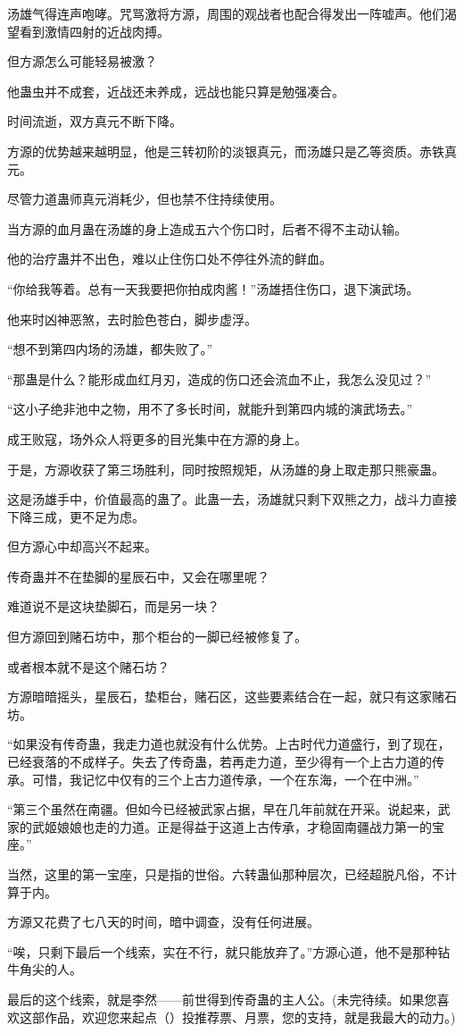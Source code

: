 \begin{this_body}
汤雄气得连声咆哮。咒骂激将方源，周围的观战者也配合得发出一阵嘘声。他们渴望看到激情四射的近战肉搏。

但方源怎么可能轻易被激？

他蛊虫并不成套，近战还未养成，远战也能只算是勉强凑合。

时间流逝，双方真元不断下降。

方源的优势越来越明显，他是三转初阶的淡银真元，而汤雄只是乙等资质。赤铁真元。

尽管力道蛊师真元消耗少，但也禁不住持续使用。

当方源的血月蛊在汤雄的身上造成五六个伤口时，后者不得不主动认输。

他的治疗蛊并不出色，难以止住伤口处不停往外流的鲜血。

“你给我等着。总有一天我要把你拍成肉酱！”汤雄捂住伤口，退下演武场。

他来时凶神恶煞，去时脸色苍白，脚步虚浮。

“想不到第四内场的汤雄，都失败了。”

“那蛊是什么？能形成血红月刃，造成的伤口还会流血不止，我怎么没见过？”

“这小子绝非池中之物，用不了多长时间，就能升到第四内城的演武场去。”

成王败寇，场外众人将更多的目光集中在方源的身上。

于是，方源收获了第三场胜利，同时按照规矩，从汤雄的身上取走那只熊豪蛊。

这是汤雄手中，价值最高的蛊了。此蛊一去，汤雄就只剩下双熊之力，战斗力直接下降三成，更不足为虑。

但方源心中却高兴不起来。

传奇蛊并不在垫脚的星辰石中，又会在哪里呢？

难道说不是这块垫脚石，而是另一块？

但方源回到赌石坊中，那个柜台的一脚已经被修复了。

或者根本就不是这个赌石坊？

方源暗暗摇头，星辰石，垫柜台，赌石区，这些要素结合在一起，就只有这家赌石坊。

“如果没有传奇蛊，我走力道也就没有什么优势。上古时代力道盛行，到了现在，已经衰落的不成样子。失去了传奇蛊，若再走力道，至少得有一个上古力道的传承。可惜，我记忆中仅有的三个上古力道传承，一个在东海，一个在中洲。”

“第三个虽然在南疆。但如今已经被武家占据，早在几年前就在开采。说起来，武家的武姬娘娘也走的力道。正是得益于这道上古传承，才稳固南疆战力第一的宝座。”

当然，这里的第一宝座，只是指的世俗。六转蛊仙那种层次，已经超脱凡俗，不计算于内。

方源又花费了七八天的时间，暗中调查，没有任何进展。

“唉，只剩下最后一个线索，实在不行，就只能放弃了。”方源心道，他不是那种钻牛角尖的人。

最后的这个线索，就是李然——前世得到传奇蛊的主人公。(未完待续。如果您喜欢这部作品，欢迎您来起点（）投推荐票、月票，您的支持，就是我最大的动力。)

\end{this_body}

